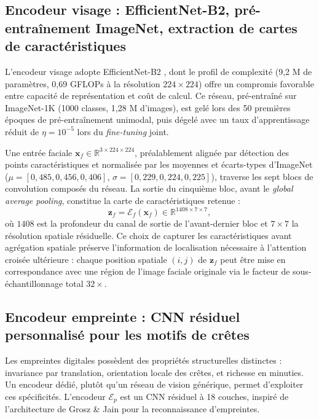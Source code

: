 \documentclass[12pt,a4paper]{report}
\begin{document}
\subsection{Encodeur visage : EfficientNet-B2, pr\'{e}-entra\^{i}nement ImageNet, extraction de cartes de caract\'{e}ristiques}

L'encodeur visage adopte EfficientNet-B2 \cite{tan2019efficientnet}, dont le profil de complexit\'{e} (9,2 M de param\`{e}tres, 0,69 GFLOPs \`{a} la r\'{e}solution $224 \times 224$) offre un compromis favorable entre capacit\'{e} de repr\'{e}sentation et co\^{u}t de calcul. Ce r\'{e}seau, pr\'{e}-entra\^{i}n\'{e} sur ImageNet-1K (1000 classes, 1,28 M d'images), est gel\'{e} lors des 50 premi\`{e}res \'{e}poques de pr\'{e}-entra\^{i}nement unimodal, puis d\'{e}gel\'{e} avec un taux d'apprentissage r\'{e}duit de $\eta = 10^{-5}$ lors du \emph{fine-tuning} joint.

Une entr\'{e}e faciale $\mathbf{x}_f \in \mathbb{R}^{3 \times 224 \times 224}$, pr\'{e}alablement align\'{e}e par d\'{e}tection des points caract\'{e}ristiques et normalis\'{e}e par les moyennes et \'{e}carts-types d'ImageNet ($\mu = [0{,}485, 0{,}456, 0{,}406]$, $\sigma = [0{,}229, 0{,}224, 0{,}225]$), traverse les sept blocs de convolution compos\'{e}s du r\'{e}seau. La sortie du cinqui\`{e}me bloc, avant le \emph{global average pooling}, constitue la carte de caract\'{e}ristiques retenue :
\begin{equation}
\mathbf{z}_f = \mathcal{E}_f(\mathbf{x}_f) \in \mathbb{R}^{1408 \times 7 \times 7},
\end{equation}
o\`{u} $1408$ est la profondeur du canal de sortie de l'avant-dernier bloc et $7 \times 7$ la r\'{e}solution spatiale r\'{e}siduelle. Ce choix de capturer les caract\'{e}ristiques avant agr\'{e}gation spatiale pr\'{e}serve l'information de localisation n\'{e}cessaire \`{a} l'attention crois\'{e}e ult\'{e}rieure : chaque position spatiale $(i, j)$ de $\mathbf{z}_f$ peut \^{e}tre mise en correspondance avec une r\'{e}gion de l'image faciale originale via le facteur de sous-\'{e}chantillonnage total $32 \times$.

\subsection{Encodeur empreinte : CNN r\'{e}siduel personnalis\'{e} pour les motifs de cr\^{e}tes}

Les empreintes digitales poss\`{e}dent des propri\'{e}t\'{e}s structurelles distinctes : invariance par translation, orientation locale des cr\^{e}tes, et richesse en minuties. Un encodeur d\'{e}di\'{e}, plut\^{o}t qu'un r\'{e}seau de vision g\'{e}n\'{e}rique, permet d'exploiter ces sp\'{e}cificit\'{e}s. L'encodeur $\mathcal{E}_p$ est un CNN r\'{e}siduel \`{a} 18 couches, inspir\'{e} de l'architecture de Grosz \& Jain \cite{grosz2024afrnet} pour la reconnaissance d'empreintes.
\end{document}
